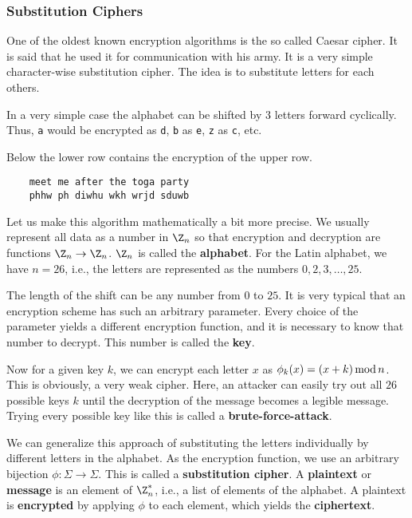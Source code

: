 \subsubsection{Substitution Ciphers}

One of the oldest known encryption algorithms is the so called Caesar cipher. It is said that he used it for communication with his army. It is a very simple character-wise substitution cipher. The idea is to substitute letters for each others.

\begin{example}
 In a very simple case the alphabet can be shifted by $3$ letters forward cyclically.
 Thus, \texttt{a} would be encrypted as \texttt{d}, \texttt{b} as \texttt{e}, \texttt{z} as \texttt{c}, etc.

 Below the lower row contains the encryption of the upper row. 
  \begin{lstlisting}
    meet me after the toga party
    phhw ph diwhu wkh wrjd sduwb
  \end{lstlisting}
\end{example}

Let us make this algorithm mathematically a bit more precise.
We usually represent all data as a number in $\Z_n$ so that encryption and decryption are functions $\Z_n\to\Z_n$.
$\Z_n$ is called the \textbf{alphabet}.
For the Latin alphabet, we have $n=26$, i.e., the letters are represented as the numbers $0, 2, 3,\ldots, 25$.

The length of the shift can be any number from $0$ to $25$.
It is very typical that an encryption scheme has such an arbitrary parameter.
Every choice of the parameter yields a different encryption function, and it is necessary to know that number to decrypt.
This number is called the \textbf{key}.

Now for a given key $k$, we can encrypt each letter $x$ as $\phi_k(x)=(x+k)\mathop{\mathrm{mod}} n$.
This is obviously, a very weak cipher.
Here, an attacker can easily try out all $26$ possible keys $k$ until the decryption of the message becomes a legible message.
Trying every possible key like this is called a \textbf{brute-force-attack}. 

We can generalize this approach of substituting the letters individually by different letters in the alphabet.
As the encryption function, we use an arbitrary bijection $\phi:\Sigma\to\Sigma$.
This is called a \textbf{substitution cipher}.
A \textbf{plaintext} or \textbf{message} is an element of $\Z_n^*$, i.e., a list of elements of the alphabet.
A plaintext is \textbf{encrypted} by applying $\phi$ to each element, which yields the \textbf{ciphertext}.


